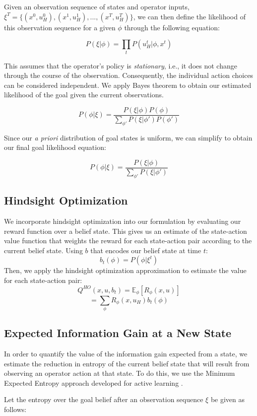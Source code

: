\documentclass[conference]{IEEEtran}
\begin{document}
Given an observation sequence of states and operator inputs, $\xi^T = \{(x^0, u_H^0), (x^1, u_H^1), ..., (x^T, u_H^T)\}$, we can then define the likelihood of this observation sequence for a given $\phi$ through the following equation:

\[
P(\xi|\phi) = \prod_tP(u_H^t|\phi, x^t)
\]

This assumes that the operator's policy is \textit{stationary}, i.e., it does not change through the course of the observation. Consequently, the individual action choices can be considered independent. We apply Bayes theorem to obtain our estimated likelihood of the goal given the current observations.

\[
P(\phi|\xi) = \frac{P(\xi|\phi)P(\phi)}{\sum_{\phi'}P(\xi|\phi')P(\phi')}
\]

Since our \textit{a priori} distribution of goal states is uniform, we can simplify to obtain our final goal likelihood equation:

\[
P(\phi|\xi) = \frac{P(\xi|\phi)}{\sum_{\phi'}P(\xi|\phi')}
\]

\subsection{Hindsight Optimization}

We incorporate hindsight optimization \cite{javdani2015shared} into our formulation by evaluating our reward function over a belief state. This gives us an estimate of the state-action value function that weights the reward for each state-action pair according to the current belief state. Using $b$ that encodes our belief state at time $t$:
\[
b_t(\phi) = P(\phi|\xi^t)
\]
Then, we apply the hindsight optimization approximation to estimate the value for each state-action pair:
\[
Q^{HO}(x,u,b_t) = \mathbb{E}_\phi[R_\phi (x, u)]
\]
\[
=\sum_\phi R_\phi (x, u_H)b_t(\phi)
\]

\subsection{Expected Information Gain at a New State}

In order to quantify the value of the information gain expected from a state, we estimate the reduction in entropy of the current belief state that will result from observing an operator action at that state. To do this, we use the Minimum Expected Entropy approach developed for active learning \cite{holub2008entropy}.

Let the entropy over the goal belief after an observation sequence $\xi$ be given as follows:
\end{document}
